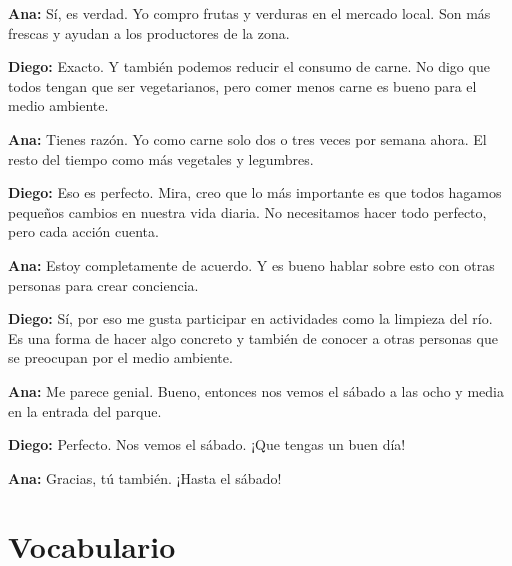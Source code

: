 \documentclass[12pt,a4paper]{article}
\begin{document}
\textbf{Ana:} Sí, es verdad. Yo compro frutas y verduras en el mercado local. Son más frescas y ayudan a los productores de la zona.

\textbf{Diego:} Exacto. Y también podemos reducir el consumo de carne. No digo que todos tengan que ser vegetarianos, pero comer menos carne es bueno para el medio ambiente.

\textbf{Ana:} Tienes razón. Yo como carne solo dos o tres veces por semana ahora. El resto del tiempo como más vegetales y legumbres.

\textbf{Diego:} Eso es perfecto. Mira, creo que lo más importante es que todos hagamos pequeños cambios en nuestra vida diaria. No necesitamos hacer todo perfecto, pero cada acción cuenta.

\textbf{Ana:} Estoy completamente de acuerdo. Y es bueno hablar sobre esto con otras personas para crear conciencia.

\textbf{Diego:} Sí, por eso me gusta participar en actividades como la limpieza del río. Es una forma de hacer algo concreto y también de conocer a otras personas que se preocupan por el medio ambiente.

\textbf{Ana:} Me parece genial. Bueno, entonces nos vemos el sábado a las ocho y media en la entrada del parque.

\textbf{Diego:} Perfecto. Nos vemos el sábado. ¡Que tengas un buen día!

\textbf{Ana:} Gracias, tú también. ¡Hasta el sábado!

\newpage

\section*{Vocabulario}
\end{document}
